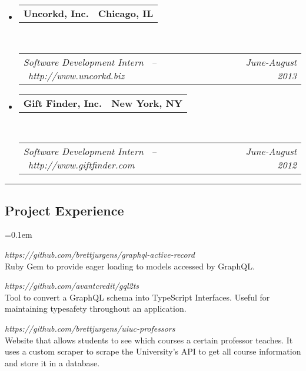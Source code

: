 \documentclass[10pt,letterpaper]{article}
\makeatletter
\newcommand{\headerrow}[2]
{\begin{tabular*}{\linewidth}{l@{\extracolsep{\fill}}r}
	#1 &
	#2 \\
\end{tabular*}}
\makeatother
\begin{document}
\begin{itemize}
	\item
	\headerrow
		{\textbf{Uncorkd, Inc.}}
		{\textbf{Chicago, IL}}
	\\
	\headerrow
		{\emph{Software Development Intern \ -- \ http://www.uncorkd.biz}}
		{\emph{June-August 2013}}
	\vspace{-1.5em}

	\item
	\headerrow
		{\textbf{Gift Finder, Inc.}}
		{\textbf{New York, NY}}
	\\
	\headerrow
		{\emph{Software Development Intern \ -- \ http://www.giftfinder.com}}
		{\emph{June-August 2012}}
	\vspace{-1.5em}

\end{itemize}

\hrule
\vspace{-0.4em}
\subsection*{Project Experience}
\begin{description}[leftmargin=0pt]
	\parskip=0.1em
	
	\item[GraphQL Active Record] 
	{\emph{https://github.com/brettjurgens/graphql-active-record}}\hfill\\
	Ruby Gem to provide eager loading to models accessed by GraphQL.

      \item[gql2ts] {\emph{https://github.com/avantcredit/gql2ts}}\hfill\\
      Tool to convert a GraphQL schema into TypeScript Interfaces. Useful for 
      maintaining typesafety throughout an application.

	\item[UIUC Professors] {\emph{https://github.com/brettjurgens/uiuc-professors}}\hfill\\
      Website that allows students to see which courses a certain professor
      teaches. It uses a custom scraper to scrape the University's API to get
      all course information and store it in a database.
\end{description}
\end{document}
